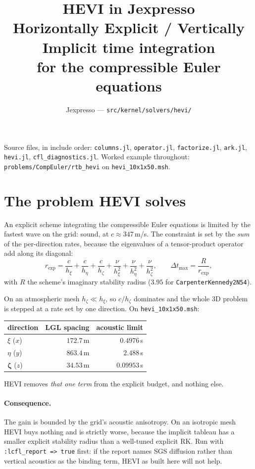 \documentclass[11pt,a4paper]{article}
\title{\textbf{HEVI in Jexpresso}\\[2mm]
\large Horizontally Explicit / Vertically Implicit time integration\\
for the compressible Euler equations}
\author{Jexpresso --- \texttt{src/kernel/solvers/hevi/}}
\date{}
\begin{document}
\maketitle

\noindent
Source files, in include order: \texttt{columns.jl}, \texttt{operator.jl},
\texttt{factorize.jl}, \texttt{ark.jl}, \texttt{hevi.jl},
\texttt{cfl\_diagnostics.jl}.
Worked example throughout: \texttt{problems/CompEuler/rtb\_hevi} on
\texttt{hevi\_10x1x50.msh}.

\tableofcontents

\section{The problem HEVI solves}

An explicit scheme integrating the compressible Euler equations is limited by
the fastest wave on the grid: sound, at $c \approx 347$\,m/s. The constraint is
set by the \emph{sum} of the per-direction rates, because the eigenvalues of a
tensor-product operator add along its diagonal:
\begin{equation}
r_{\mathrm{exp}}
 = \frac{c}{h_\xi}+\frac{c}{h_\eta}+\frac{c}{h_\zeta}
 + \frac{\nu}{h_\xi^2}+\frac{\nu}{h_\eta^2}+\frac{\nu}{h_\zeta^2},
\qquad
\Delta t_{\max}=\frac{R}{r_{\mathrm{exp}}},
\end{equation}
with $R$ the scheme's imaginary stability radius ($3.95$ for
\texttt{CarpenterKennedy2N54}).

On an atmospheric mesh $h_\zeta \ll h_\xi$, so $c/h_\zeta$ dominates and the
whole 3D problem is stepped at a rate set by one direction. On
\texttt{hevi\_10x1x50.msh}:

\begin{center}
\begin{tabular}{lrr}
\toprule
direction & LGL spacing & acoustic limit \\
\midrule
$\xi$ ($x$)  & $172.7$\,m & $0.4976$\,s \\
$\eta$ ($y$) & $863.4$\,m & $2.488$\,s  \\
$\bm{\zeta}$ ($z$) & $\bm{34.53}$\,m & $\bm{0.09953}$\,s \\
\bottomrule
\end{tabular}
\end{center}

\noindent
HEVI removes \emph{that one term} from the explicit budget, and nothing else.

\paragraph{Consequence.} The gain is bounded by the grid's acoustic
anisotropy. On an isotropic mesh HEVI buys nothing and is strictly worse,
because the implicit tableau has a smaller explicit stability radius than a
well-tuned explicit RK. Run with \texttt{:lcfl\_report => true} first: if the
report names SGS diffusion rather than vertical acoustics as the binding term,
HEVI as built here will not help.
\end{document}
